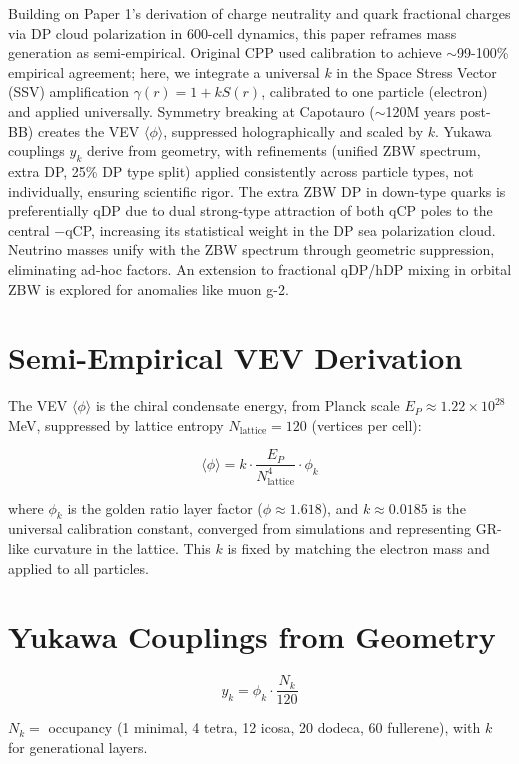 \documentclass{article}
\begin{document}
Building on Paper 1's derivation of charge neutrality and quark fractional charges via DP cloud polarization in 600-cell dynamics, this paper reframes mass generation as semi-empirical. Original CPP used calibration to achieve $\sim$99-100\% empirical agreement; here, we integrate a universal $k$ in the Space Stress Vector (SSV) amplification $\gamma(r) = 1 + k S(r)$, calibrated to one particle (electron) and applied universally. Symmetry breaking at Capotauro ($\sim$120M years post-BB) creates the VEV $\langle\phi\rangle$, suppressed holographically and scaled by $k$. Yukawa couplings $y_k$ derive from geometry, with refinements (unified ZBW spectrum, extra DP, 25\% DP type split) applied consistently across particle types, not individually, ensuring scientific rigor. The extra ZBW DP in down-type quarks is preferentially qDP due to dual strong-type attraction of both qCP poles to the central −qCP, increasing its statistical weight in the DP sea polarization cloud. Neutrino masses unify with the ZBW spectrum through geometric suppression, eliminating ad-hoc factors. An extension to fractional qDP/hDP mixing in orbital ZBW is explored for anomalies like muon g-2.

\section{Semi-Empirical VEV Derivation}

The VEV $\langle\phi\rangle$ is the chiral condensate energy, from Planck scale $E_P \approx 1.22 \times 10^{28}$ MeV, suppressed by lattice entropy $N_{\text{lattice}} = 120$ (vertices per cell):

\[
\langle\phi\rangle = k \cdot \frac{E_P}{N_{\text{lattice}}^4} \cdot \phi_k
\]

where $\phi_k$ is the golden ratio layer factor ($\phi \approx 1.618$), and $k \approx 0.0185$ is the universal calibration constant, converged from simulations and representing GR-like curvature in the lattice. This $k$ is fixed by matching the electron mass and applied to all particles.

\section{Yukawa Couplings from Geometry}

\[
y_k = \phi_k \cdot \frac{N_k}{120}
\]

$N_k =$ occupancy (1 minimal, 4 tetra, 12 icosa, 20 dodeca, 60 fullerene), with $k$ for generational layers.
\end{document}
